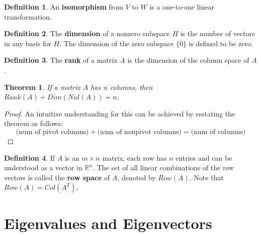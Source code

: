 \documentclass[letterpaper]{article}
\newtheorem{theorem}{Theorem}
\theoremstyle{definition}
\newtheorem{definition}{Definition}[section]
\begin{document}
\begin{definition}
An \textbf{isomorphism} from $V$ to $W$ is a one-to-one linear transformation. 
\end{definition}

\begin{definition}
The \textbf{dimension} of a nonzero subspace $H$ is the number of vectors in any basis for $H$. The dimension of the zero subspace $\{0\}$ is defined to be zero. 
\end{definition}

\begin{definition}
The \textbf{rank} of a matrix $A$ is the dimension of the column space of $A$. 
\end{definition}

\begin{theorem}
If a matrix $A$ has $n$ columns, then $Rank(A) + Dim(Nul(A)) = n$. 
\end{theorem}
\begin{proof}
An intuitive understanding for this can be achieved by restating the theorem as follows:
$$ \Big( \text{num of pivot columns} \Big) + \Big( \text{num of nonpivot columns} \Big) = \Big( \text{num of columns} \Big)   $$
\end{proof}

\begin{definition}
If $A$ is an $m \times n$ matrix, each row has $n$ entries and can be understood as a vector in $\mathbb{R}^n$. The set of all linear combinations of the row vectors is called the \textbf{row space} of $A$, denoted by $Row(A)$. Note that $Row(A) = Col(A^{T})$. 
\end{definition}

\section{Eigenvalues and Eigenvectors}
\end{document}
